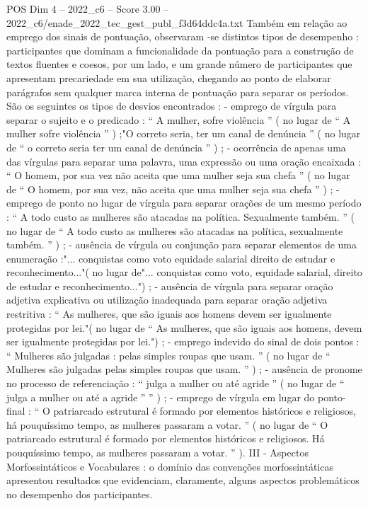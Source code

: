 \begin{textsample}{POS Dim 4 – 2022\_c6 – Score 3.00 – 2022\_c6/enade\_2022\_tec\_gest\_publ\_f3d64ddc4a.txt}
Também em relação ao emprego dos sinais de pontuação, observaram -se distintos tipos de desempenho : participantes que dominam a funcionalidade da pontuação para a construção de textos fluentes e coesos, por um lado, e um grande número de participantes que apresentam precariedade em sua utilização, chegando ao ponto de elaborar parágrafos sem qualquer marca interna de pontuação para separar os períodos.
São os seguintes os tipos de desvios encontrados : - emprego de vírgula para separar o sujeito e o predicado : “ A mulher, sofre violência ” ( no lugar de “ A mulher sofre violência ” ) ;"O correto seria, ter um canal de denúncia ” ( no lugar de “ o correto seria ter um canal de denúncia ” ) ; - ocorrência de apenas uma das vírgulas para separar uma palavra, uma expressão ou uma oração encaixada : “ O homem, por sua vez não aceita que uma mulher seja sua chefa ” ( no lugar de “ O homem, por sua vez, não aceita que uma mulher seja sua chefa ” ) ; - emprego de ponto no lugar de vírgula para separar orações de um mesmo período : “ A todo custo as mulheres são atacadas na política.
Sexualmente também. ” ( no lugar de “ A todo custo as mulheres são atacadas na política, sexualmente também. ” ) ; - ausência de vírgula ou conjunção para separar elementos de uma enumeração :"... conquistas como voto equidade salarial direito de estudar e reconhecimento..."( no lugar de"... conquistas como voto, equidade salarial, direito de estudar e reconhecimento...") ; - ausência de vírgula para separar oração adjetiva explicativa ou utilização inadequada para separar oração adjetiva restritiva : “ As mulheres, que são iguais aos homens devem ser igualmente protegidas por lei."( no lugar de “ As mulheres, que são iguais aos homens, devem ser igualmente protegidas por lei.") ; - emprego indevido do sinal de dois pontos : “ Mulheres são julgadas : pelas simples roupas que usam. ” ( no lugar de “ Mulheres são julgadas pelas simples roupas que usam. ” ) ; - ausência de pronome no processo de referenciação : “ julga a mulher ou até agride ” ( no lugar de “ julga a mulher ou até a agride ” ” ) ; - emprego de vírgula em lugar do ponto-final : “ O patriarcado estrutural é formado por elementos históricos e religiosos, há pouquíssimo tempo, as mulheres passaram a votar. ” ( no lugar de “ O patriarcado estrutural é formado por elementos históricos e religiosos.
Há pouquíssimo tempo, as mulheres passaram a votar. ” ).
III - Aspectos Morfossintáticos e Vocabulares : o domínio das convenções morfossintáticas apresentou resultados que evidenciam, claramente, alguns aspectos problemáticos no desempenho dos participantes.

\end{textsample}
